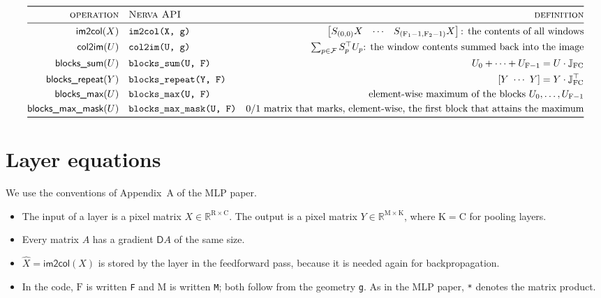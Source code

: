 \documentclass[twoside,11pt]{article}
\newcommand{\const}[1]{\ensuremath{\mathrm{#1}}} %
\newcommand{\func}[1]{\ensuremath{\textsf{#1}}}  %
\newcommand{\Gradient}{\textsf{D}}
\newcommand{\Reals}{\mathbb{R}}
\newcommand{\Fs}{\const{F}}          %
\newcommand{\im}{\func{im2col}}
\newcommand{\ci}{\func{col2im}}
\newcommand{\bsum}{\func{blocks\_sum}}
\newcommand{\brep}{\func{blocks\_repeat}}
\newcommand{\bmax}{\func{blocks\_max}}
\newcommand{\bmask}{\func{blocks\_max\_mask}}
\newcommand{\Pos}{\mathcal{F}}       %
\newcommand{\Jm}{\mathbb{J}}         %
\begin{document}
\begin{table}[thbp]
\centering
\caption{Matrix operations for convolutional and pooling layers. Here $X \in \Reals^{\const{R} \times \const{C}}$ is a pixel matrix, $U \in \Reals^{\const{M} \times \Fs\const{C}}$ consists of $\Fs$ blocks $U_j \in \Reals^{\const{M} \times \const{C}}$, and $Y \in \Reals^{\const{M} \times \const{C}}$. The selection matrices $S_p$ are defined in Definition~\ref{def:selection-matrix}, and $\Jm_{\Fs\const{C}}$ in Section~\ref{section:blocks}.}
\label{table:conv-operations}
{
\small
\begin{align*}
\toprule
    \textsc{operation} &\quad \textsc{Nerva API} & \textsc{definition}
    \\
    \midrule
    \im(X) &\quad \texttt{im2col(X, g)} & \begin{bmatrix} S_{(0,0)} X & \cdots & S_{(\Fs_1-1,\Fs_2-1)} X \end{bmatrix} \text{: the contents of all windows}
    \\
    \ci(U) &\quad \texttt{col2im(U, g)} & \textstyle\sum_{p \in \Pos} S_p^\top U_p \text{: the window contents summed back into the image}
    \\
    \bsum(U) &\quad \texttt{blocks\_sum(U, F)} & U_0 + \cdots + U_{\Fs-1} = U \cdot \Jm_{\Fs\const{C}}
    \\
    \brep(Y) &\quad \texttt{blocks\_repeat(Y, F)} & [Y \ \cdots \ Y] = Y \cdot \Jm_{\Fs\const{C}}^\top
    \\
    \bmax(U) &\quad \texttt{blocks\_max(U, F)} & \text{element-wise maximum of the blocks } U_0, \ldots, U_{\Fs-1}
    \\
    \bmask(U) &\quad \texttt{blocks\_max\_mask(U, F)} & \text{0/1 matrix that marks, element-wise, the first block that attains the maximum}
    \\
    \bottomrule
\end{align*}
}
\end{table}

\section{Layer equations} \label{section:layers}

We use the conventions of Appendix~A of the MLP paper.
\begin{itemize}
\item The input of a layer is a pixel matrix $X \in \Reals^{\const{R} \times \const{C}}$. The output is a pixel matrix $Y \in \Reals^{\const{M} \times \const{K}}$, where $\const{K} = \const{C}$ for pooling layers.
\item Every matrix $A$ has a gradient $\Gradient A$ of the same size.
\item $\hat X = \im(X)$ is stored by the layer in the feedforward pass, because it is needed again for backpropagation.
\item In the code, $\Fs$ is written \texttt{F} and $\const{M}$ is written \texttt{M}; both follow from the geometry \texttt{g}. As in the MLP paper, \texttt{*} denotes the matrix product.
\end{itemize}
\end{document}
